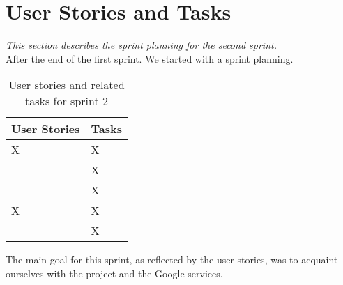 \section{User Stories and Tasks} \label{Sprint2_SecUserStoriesAndTasks}
\textit{This section describes the sprint planning for the second sprint.}\\

After the end of the first sprint. We started with a sprint planning.

\begin{table}[H]
	\centering
	\begin{tabular}{ll}
		\textbf{User Stories} & \textbf{Tasks}\\ \hline \noalign{\vskip 2mm}
		X & X\\
		& X\\
		& X\\ \hline
		X & X\\
		& X\\ \hline
	\end{tabular}
	\caption{User stories and related tasks for sprint 2}
	\label{Sprint2_UserStories2_table}
\end{table}

The main goal for this sprint, as reflected by the user stories, was to acquaint ourselves with the project and the Google services.\\